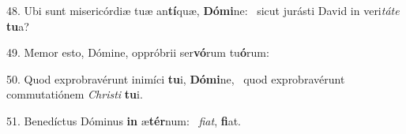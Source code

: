 48. Ubi sunt misericórdiæ tuæ an\textbf{tí}quæ, \textbf{Dó}\textbf{mi}ne: \ast\  sicut jurásti David in veri\textit{tá}\textit{te} \textbf{tu}a?\

49. Memor esto, Dómine, oppróbrii ser\textbf{vó}rum tu\textbf{ó}rum: \ast\  \

50. Quod exprobravérunt inimíci \textbf{tu}i, \textbf{Dó}\textbf{mi}ne, \ast\  quod exprobravérunt commutatiónem \textit{Chris}\textit{ti} \textbf{tu}i.\

51. Benedíctus Dóminus \textbf{in} æ\textbf{tér}num: \ast\  \textit{fi}\textit{at}, \textbf{fi}at.\

